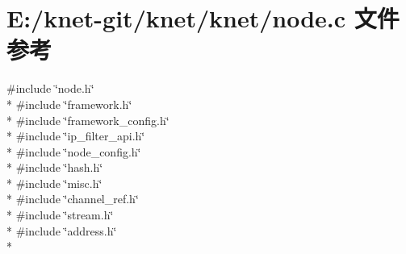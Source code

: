 \hypertarget{a00101}{}\section{E\+:/knet-\/git/knet/knet/node.c 文件参考}
\label{a00101}
{\ttfamily \#include \char`\"{}node.\+h\char`\"{}}\\*
{\ttfamily \#include \char`\"{}framework.\+h\char`\"{}}\\*
{\ttfamily \#include \char`\"{}framework\+\_\+config.\+h\char`\"{}}\\*
{\ttfamily \#include \char`\"{}ip\+\_\+filter\+\_\+api.\+h\char`\"{}}\\*
{\ttfamily \#include \char`\"{}node\+\_\+config.\+h\char`\"{}}\\*
{\ttfamily \#include \char`\"{}hash.\+h\char`\"{}}\\*
{\ttfamily \#include \char`\"{}misc.\+h\char`\"{}}\\*
{\ttfamily \#include \char`\"{}channel\+\_\+ref.\+h\char`\"{}}\\*
{\ttfamily \#include \char`\"{}stream.\+h\char`\"{}}\\*
{\ttfamily \#include \char`\"{}address.\+h\char`\"{}}\\*
